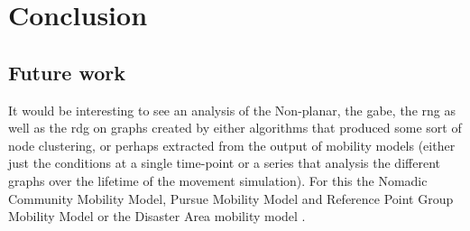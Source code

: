 \section{Conclusion}
\label{section:conclusion}





\subsection{Future work}
\label{section:future_work}
It would be interesting to see an analysis of the Non-planar, the \ac{gabe}, the \ac{rng} as well as the \ac{rdg} on graphs created by either algorithms that produced some sort of node clustering, or perhaps extracted from the output of mobility models (either just the conditions at a single time-point or a series that analysis the different graphs over the lifetime of the movement simulation). For this the Nomadic Community Mobility Model, Pursue Mobility Model and Reference Point Group Mobility Model \cite{MobilityAdHocResearch} or the Disaster Area mobility model \cite{disasterArea}.
